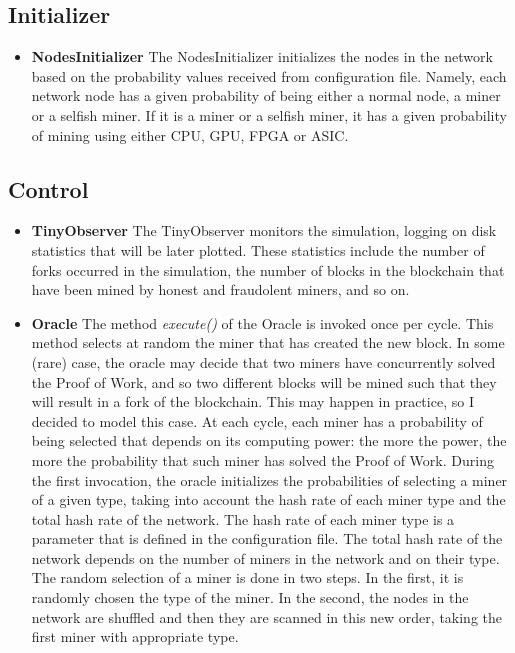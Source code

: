 \documentclass{article}
\begin{document}
\subsection{Initializer}
\begin{itemize}
\item \textbf{NodesInitializer} The NodesInitializer initializes the nodes in the network based on the probability values received from configuration file. Namely, each network node has a given probability of being either a normal node, a miner or a selfish miner. If it is a miner or a selfish miner, it has a given probability of mining using either CPU, GPU, FPGA or ASIC. 
\end{itemize}
\subsection{Control}
\begin{itemize}
\item \textbf{TinyObserver} The TinyObserver monitors the simulation, logging on disk statistics that will be later plotted. These statistics include the number of forks occurred in the simulation, the number of blocks in the blockchain that have been mined by honest and fraudolent miners, and so on. 
\item \textbf{Oracle} The method \textit{execute()} of the Oracle is invoked once per cycle. This method selects at random the miner that has created the new block. In some (rare) case, the oracle may decide that two miners have concurrently solved the Proof of Work, and so two different blocks will be mined such that they will result in a fork of the blockchain. This may happen in practice, so I decided to model this case. At each cycle, each miner has a probability of being selected that depends on its computing power: the more the power, the more the probability that such miner has solved the Proof of Work. During the first invocation, the oracle initializes the probabilities of selecting a miner of a given type, taking into account the hash rate of each miner type and the total hash rate of the network. The hash rate of each miner type is a parameter that is defined in the configuration file. The total hash rate of the network depends on the number of miners in the network and on their type. The random selection of a miner is done in two steps. In the first, it is randomly chosen the type of the miner. In the second, the nodes in the network are shuffled and then they are scanned in this new order, taking the first miner with appropriate type.
\end{itemize}
\end{document}
